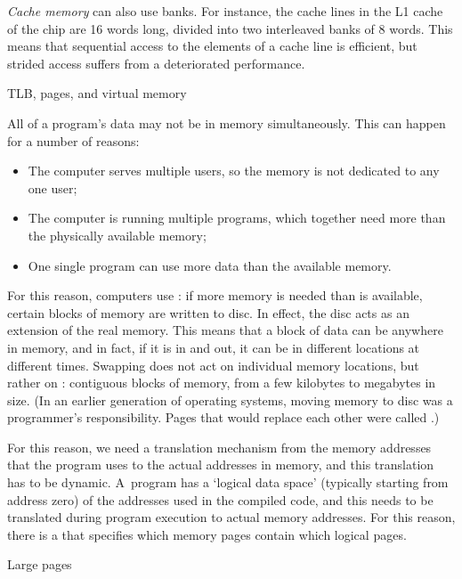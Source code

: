 \emph{Cache memory} can also use banks. For instance, the
cache lines in the L1 cache of the  chip
are 16 words long, divided into two interleaved banks of 8 words. This
means that sequential access to the elements of a cache line is
efficient, but strided access suffers from a deteriorated performance.

 {TLB, pages, and virtual memory}
\label{sec:smallpage}

All of a program's data may not be in memory simultaneously. This can
happen for a number of reasons:
\begin{itemize}
\item The computer serves multiple users, so the memory is not
  dedicated to any one user;
\item The computer is running multiple programs, which together need
  more than the physically available memory;
\item One single program can use more data than the available memory.
\end{itemize}
For this reason, computers use : if more
memory is needed than is available, certain blocks of memory are
written to disc. In effect, the disc acts as an extension of the real
memory. This means that a block of data can be anywhere in memory, and
in fact, if it is  in and out, it can be in
different locations at different times. Swapping does not act on
individual memory locations, but rather on :
contiguous blocks of memory, from a few kilobytes to megabytes in size.
(In an earlier generation of operating systems, moving memory to disc
was a programmer's responsibility. Pages that would replace each other
were called .)

For this reason, we need a translation mechanism from the memory
addresses that the program uses to the actual addresses in memory, and
this translation has to be dynamic. A~program has a `logical data
space' (typically starting from address zero) of the addresses used in
the compiled code, and this needs to be translated during program
execution to actual memory addresses. For this reason, there is a
 that specifies which memory pages contain which
logical pages.

 {Large pages}


